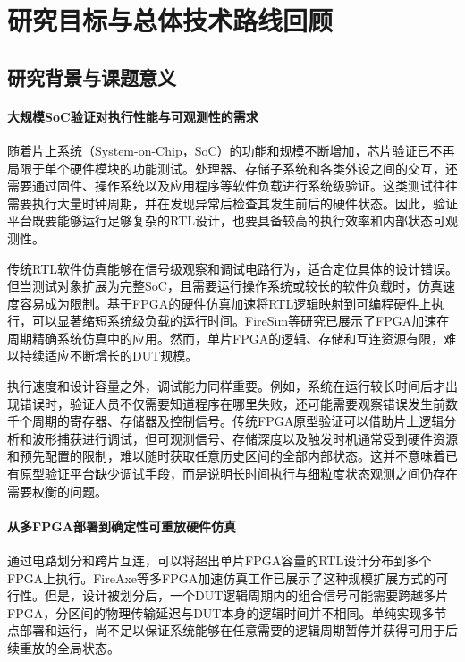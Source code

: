 \section{研究目标与总体技术路线回顾}

\subsection{研究背景与课题意义}

\paragraph{大规模SoC验证对执行性能与可观测性的需求}

随着片上系统（System-on-Chip，SoC）的功能和规模不断增加，芯片验证已不再局限于单个硬件模块的功能测试。处理器、存储子系统和各类外设之间的交互，还需要通过固件、操作系统以及应用程序等软件负载进行系统级验证。这类测试往往需要执行大量时钟周期，并在发现异常后检查其发生前后的硬件状态。因此，验证平台既要能够运行足够复杂的RTL设计，也要具备较高的执行效率和内部状态可观测性。

传统RTL软件仿真能够在信号级观察和调试电路行为，适合定位具体的设计错误。但当测试对象扩展为完整SoC，且需要运行操作系统或较长的软件负载时，仿真速度容易成为限制。基于FPGA的硬件仿真加速将RTL逻辑映射到可编程硬件上执行，可以显著缩短系统级负载的运行时间。FireSim等研究已展示了FPGA加速在周期精确系统仿真中的应用\cite{chung_firesim_2018}。然而，单片FPGA的逻辑、存储和互连资源有限，难以持续适应不断增长的DUT规模。

执行速度和设计容量之外，调试能力同样重要。例如，系统在运行较长时间后才出现错误时，验证人员不仅需要知道程序在哪里失败，还可能需要观察错误发生前数千个周期的寄存器、存储器及控制信号。传统FPGA原型验证可以借助片上逻辑分析和波形捕获进行调试，但可观测信号、存储深度以及触发时机通常受到硬件资源和预先配置的限制，难以随时获取任意历史区间的全部内部状态。这并不意味着已有原型验证平台缺少调试手段，而是说明长时间执行与细粒度状态观测之间仍存在需要权衡的问题。

\paragraph{从多FPGA部署到确定性可重放硬件仿真}

通过电路划分和跨片互连，可以将超出单片FPGA容量的RTL设计分布到多个FPGA上执行。FireAxe等多FPGA加速仿真工作已展示了这种规模扩展方式的可行性\cite{whangbo_fireaxe_2024}。但是，设计被划分后，一个DUT逻辑周期内的组合信号可能需要跨越多片FPGA，分区间的物理传输延迟与DUT本身的逻辑时间并不相同。单纯实现多节点部署和运行，尚不足以保证系统能够在任意需要的逻辑周期暂停并获得可用于后续重放的全局状态。

